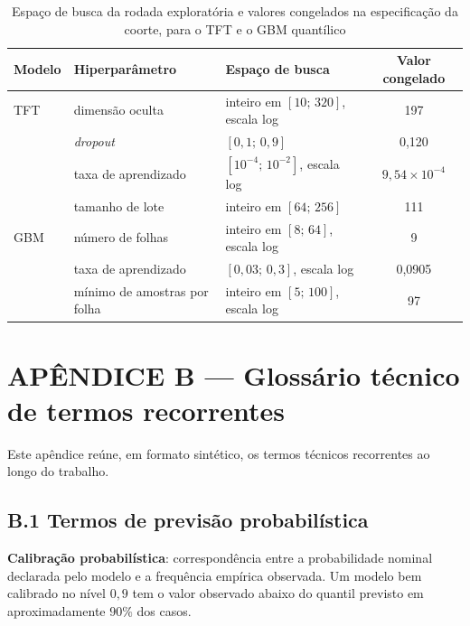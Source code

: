 \begin{table}[htb]
\centering
\caption[Espaço de busca e valores congelados dos hiperparâmetros]{Espaço de busca da rodada exploratória e valores congelados na especificação da coorte, para o TFT e o GBM quantílico}
\label{tab:hiperparametros}
\small
\begin{tabular}{l l l c}
\toprule
Modelo & Hiperparâmetro & Espaço de busca & Valor congelado \\
\midrule
TFT & dimensão oculta & inteiro em \([10;\,320]\), escala log & 197 \\
 & \textit{dropout} & \([0{,}1;\,0{,}9]\) & 0,120 \\
 & taxa de aprendizado & \([10^{-4};\,10^{-2}]\), escala log & \(9{,}54 \times 10^{-4}\) \\
 & tamanho de lote & inteiro em \([64;\,256]\) & 111 \\
\midrule
GBM & número de folhas & inteiro em \([8;\,64]\), escala log & 9 \\
 & taxa de aprendizado & \([0{,}03;\,0{,}3]\), escala log & 0,0905 \\
 & mínimo de amostras por folha & inteiro em \([5;\,100]\), escala log & 97 \\
\bottomrule
\end{tabular}
\end{table}

\chapter*{APÊNDICE B --- Glossário técnico de termos recorrentes}

Este apêndice reúne, em formato sintético, os termos técnicos recorrentes ao longo do trabalho.

\section*{B.1 Termos de previsão probabilística}

\label{gl:calibracao}\textbf{Calibração probabilística}: correspondência entre a probabilidade nominal declarada pelo modelo e a frequência empírica observada. Um modelo bem calibrado no nível \(0{,}9\) tem o valor observado abaixo do quantil previsto em aproximadamente \(90\%\) dos casos.

